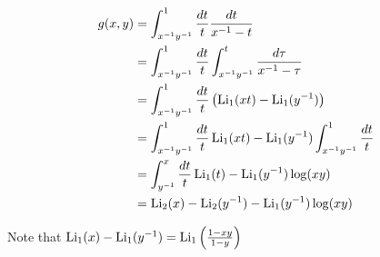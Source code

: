 \documentclass[main]{subfiles}
\begin{document}
\begin{example}
\begin{align*}
g(x,y)&=\int_{x^{-1}y^{-1}}^1\frac{dt}{t}\frac{dt}{x^{-1}-t} \\
&=\int_{x^{-1}y^{-1}}^1\frac{dt}{t}\int_{x^{-1}y^{-1}}^t\frac{d\tau}{x^{-1}-\tau} \\
&=\int_{x^{-1}y^{-1}}^1\frac{dt}{t}\left(\operatorname{Li}_1(xt)-\operatorname{Li}_1(y^{-1})\right) \\
&=\int_{x^{-1}y^{-1}}^1\frac{dt}{t}\operatorname{Li}_1(xt)-\operatorname{Li}_1(y^{-1})\int_{x^{-1}y^{-1}}^1\frac{dt}{t} \\
&=\int_{y^{-1}}^x\frac{dt}{t}\operatorname{Li}_1(t)-\operatorname{Li}_1(y^{-1})\log(xy) \\
&=\operatorname{Li}_2(x)-\operatorname{Li}_2(y^{-1})-\operatorname{Li}_1(y^{-1})\log(xy)
\end{align*}
\end{example}

\begin{note}
Note that $\operatorname{Li}_1(x)-\operatorname{Li}_1(y^{-1})=\operatorname{Li}_1\left(\frac{1-xy}{1-y}\right)$
\end{note}
\end{document}
